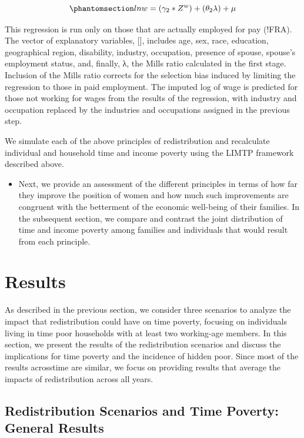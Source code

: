 \documentclass[
  11pt,
]{article}
\providecommand{\tightlist}{%
  \setlength{\itemsep}{0pt}\setlength{\parskip}{0pt}}\usepackage{longtable,booktabs,array}
\begin{document}
\begin{equation}\phantomsection\label{eq-OLS}{lnw= (\gamma_2*Z^w) + (\theta_2 \lambda) + \mu
}\end{equation}

This regression is run only on those that are actually employed for pay
(!FRA). The vector of explanatory variables, {[}{]}, includes age, sex,
race, education, geographical region, disability, industry, occupation,
presence of spouse, spouse's employment status, and, finally, λ, the
Mills ratio calculated in the first stage. Inclusion of the Mills ratio
corrects for the selection bias induced by limiting the regression to
those in paid employment. The imputed log of wage is predicted for those
not working for wages from the results of the regression, with industry
and occupation replaced by the industries and occupations assigned in
the previous step.

We simulate each of the above principles of redistribution and
recalculate individual and household time and income poverty using the
LIMTP framework described above.

\begin{itemize}
\tightlist
\item
  Next, we provide an assessment of the different principles in terms of
  how far they improve the position of women and how much such
  improvements are congruent with the betterment of the economic
  well-being of their families. In the subsequent section, we compare
  and contrast the joint distribution of time and income poverty among
  families and individuals that would result from each principle.
\end{itemize}

\section{Results}\label{results}

As described in the previous section, we consider three scenarios to
analyze the impact that redistribution could have on time poverty,
focusing on individuals living in time poor households with at least two
working-age members. In this section, we present the results of the
redistribution scenarios and discuss the implications for time poverty
and the incidence of hidden poor. Since most of the results acrosstime
are similar, we focus on providing results that average the impacts of
redistribution across all years.

\subsection{Redistribution Scenarios and Time Poverty: General
Results}\label{redistribution-scenarios-and-time-poverty-general-results}
\end{document}
